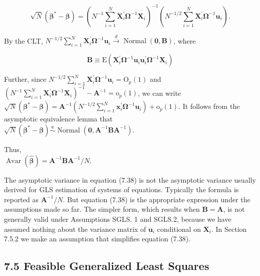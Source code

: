 \documentclass[10pt]{article}
\begin{document}
\begin{equation*}
\sqrt{N}\left(\boldsymbol{\beta}^{*}-\boldsymbol{\beta}\right)=\left(N^{-1} \sum_{i=1}^{N} \mathbf{X}_{i}^{\prime} \boldsymbol{\Omega}^{-1} \mathbf{X}_{i}\right)^{-1}\left(N^{-1 / 2} \sum_{i=1}^{N} \mathbf{X}_{i}^{\prime} \boldsymbol{\Omega}^{-1} \mathbf{u}_{i}\right) . \tag{7.35}
\end{equation*}


By the CLT, $N^{-1 / 2} \sum_{i=1}^{N} \mathbf{X}_{i}^{\prime} \boldsymbol{\Omega}^{-1} \mathbf{u}_{i} \xrightarrow{d} \operatorname{Normal}(\mathbf{0}, \mathbf{B})$, where


\begin{equation*}
\mathbf{B} \equiv \mathrm{E}\left(\mathbf{X}_{i}^{\prime} \boldsymbol{\Omega}^{-1} \mathbf{u}_{i} \mathbf{u}_{i}^{\prime} \boldsymbol{\Omega}^{-1} \mathbf{X}_{i}\right) \tag{7.36}
\end{equation*}


Further, since $N^{-1 / 2} \sum_{i=1}^{N} \mathbf{X}_{i}^{\prime} \boldsymbol{\Omega}^{-1} \mathbf{u}_{i}=\mathrm{O}_{p}(1)$ and $\left(N^{-1} \sum_{i=1}^{N} \mathbf{X}_{i}^{\prime} \boldsymbol{\Omega}^{-1} \mathbf{X}_{i}\right)^{-1}-\mathbf{A}^{-1}= \mathrm{o}_{p}(1)$, we can write $\sqrt{N}\left(\boldsymbol{\beta}^{*}-\boldsymbol{\beta}\right)=\mathbf{A}^{-1}\left(N^{-1 / 2} \sum_{i=1}^{N} \mathbf{x}_{i}^{\prime} \boldsymbol{\Omega}^{-1} \mathbf{u}_{i}\right)+\mathrm{o}_{p}(1)$. It follows from the asymptotic equivalence lemma that\\
$\sqrt{N}\left(\boldsymbol{\beta}^{*}-\boldsymbol{\beta}\right) \stackrel{a}{\sim} \operatorname{Normal}\left(\mathbf{0}, \mathbf{A}^{-1} \mathbf{B A}^{-1}\right)$.

Thus,\\
$\operatorname{Avar}(\hat{\boldsymbol{\beta}})=\mathbf{A}^{-1} \mathbf{B A}^{-1} / N$.

The asymptotic variance in equation (7.38) is not the asymptotic variance usually derived for GLS estimation of systems of equations. Typically the formula is reported as $\mathbf{A}^{-1} / N$. But equation (7.38) is the appropriate expression under the assumptions made so far. The simpler form, which results when $\mathbf{B}=\mathbf{A}$, is not generally valid under Assumptions SGLS. 1 and SGLS.2, because we have assumed nothing about the variance matrix of $\mathbf{u}_{i}$ conditional on $\mathbf{X}_{i}$. In Section 7.5.2 we make an assumption that simplifies equation (7.38).

\subsection*{7.5 Feasible Generalized Least Squares}
\end{document}
